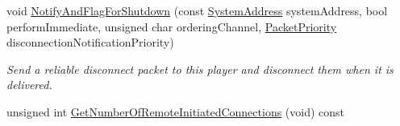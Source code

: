 \begin{DoxyCompactItemize}
\item 
\hypertarget{class_rak_net_1_1_rak_peer_abff708e05373259e91ec0a863fbaf375}{void \hyperlink{class_rak_net_1_1_rak_peer_abff708e05373259e91ec0a863fbaf375}{Notify\-And\-Flag\-For\-Shutdown} (const \hyperlink{struct_rak_net_1_1_system_address}{System\-Address} system\-Address, bool perform\-Immediate, unsigned char ordering\-Channel, \hyperlink{_packet_priority_8h_a659378374e516180f93640c79f59705c}{Packet\-Priority} disconnection\-Notification\-Priority)}\label{class_rak_net_1_1_rak_peer_abff708e05373259e91ec0a863fbaf375}

\begin{DoxyCompactList}\small\item\em Send a reliable disconnect packet to this player and disconnect them when it is delivered. \end{DoxyCompactList}\item 
\hypertarget{class_rak_net_1_1_rak_peer_acea8348eddf6e6b24f6e438b3c5f881d}{unsigned int \hyperlink{class_rak_net_1_1_rak_peer_acea8348eddf6e6b24f6e438b3c5f881d}{Get\-Number\-Of\-Remote\-Initiated\-Connections} (void) const }\label{class_rak_net_1_1_rak_peer_acea8348eddf6e6b24f6e438b3c5f881d}


\end{DoxyCompactItemize}
